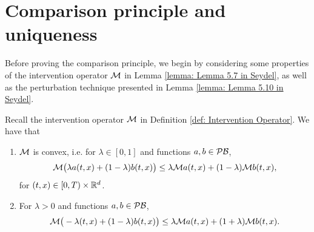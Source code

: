 \section{Comparison principle and uniqueness}
\label{section: Proof of the Uniqueness}
Before proving the comparison principle, we begin by considering some properties of the intervention operator $\mathcal{M}$ in Lemma \ref{lemma: Lemma 5.7 in Seydel}, as well as the perturbation technique presented in Lemma \ref{lemma: Lemma 5.10 in Seydel}.
\begin{lemma}
\label{lemma: Lemma 5.7 in Seydel}
    Recall the intervention operator $\mathcal{M}$ in Definition \ref{def: Intervention Operator}. We have that
    \begin{enumerate}[label=(\roman*)]
        \item $\mathcal{M}$ is convex, i.e. for $\lambda \in [0,1]$ and functions $a,b \in \mathcal{PB}$, 
        \begin{equation*}
            \mathcal{M} \big( \lambda a(t,x) + (1-\lambda) b(t,x) \big) \leq \lambda \mathcal{M} a(t,x) + (1-\lambda) \mathcal{M} b(t,x),
        \end{equation*}
        for $(t,x) \in [0,T) \times \mathbb{R}^d$.

        \item For $\lambda > 0$ and functions $a,b \in \mathcal{PB}$, 
        \begin{equation*}
            \mathcal{M} \big(- \lambda (t,x) + (1-\lambda)b(t,x) \big) \leq \lambda \mathcal{M} a(t,x) + (1+\lambda) \mathcal{M} b(t,x).
        \end{equation*}
    \end{enumerate}
\end{lemma}
